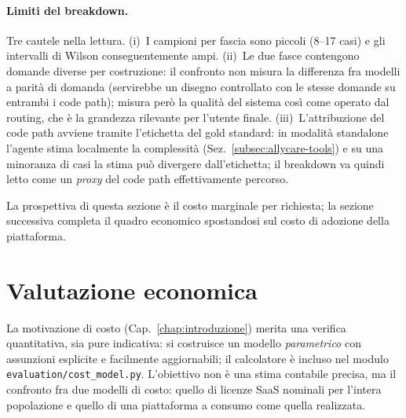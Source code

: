 \paragraph{Limiti del breakdown.} Tre cautele nella lettura.
(i)~I campioni per fascia sono piccoli (8--17 casi) e gli intervalli di
Wilson conseguentemente ampi. (ii)~Le due fasce contengono domande diverse
per costruzione: il confronto non misura la differenza fra modelli a parità
di domanda (servirebbe un disegno controllato con le stesse domande su
entrambi i code path); misura però la qualità del sistema così come operato
dal routing, che è la grandezza rilevante per l'utente finale.
(iii)~L'attribuzione del code path avviene tramite l'etichetta del gold
standard: in modalità standalone l'agente stima localmente la complessità
(Sez.~\ref{subsec:allycare-tools}) e su una minoranza di casi la stima può
divergere dall'etichetta; il breakdown va quindi letto come un \emph{proxy}
del code path effettivamente percorso.

La prospettiva di questa sezione è il costo marginale per richiesta; la
sezione successiva completa il quadro economico spostandosi sul costo di
adozione della piattaforma.

\section{Valutazione economica}
\label{sec:eval-costi}

La motivazione di costo (Cap.~\ref{chap:introduzione}) merita una verifica quantitativa, sia pure indicativa:
si costruisce un modello \emph{parametrico} con assunzioni esplicite e facilmente aggiornabili;
il calcolatore è incluso nel modulo \texttt{evaluation/cost\_model.py}.
L'obiettivo non è una stima contabile precisa, ma il confronto fra due modelli di costo: quello di licenze SaaS nominali per l'intera popolazione
e quello di una piattaforma a consumo come quella realizzata.

